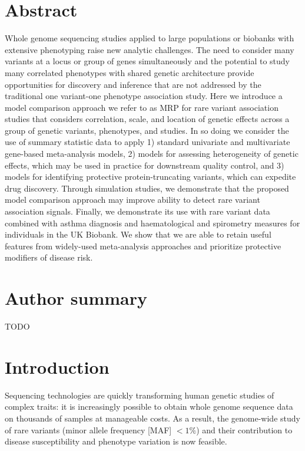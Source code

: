 \section*{Abstract}
Whole genome sequencing studies applied to large populations or biobanks with extensive phenotyping raise new analytic challenges. The need to consider many variants at a locus or group of genes simultaneously and the potential to study many correlated phenotypes with shared genetic architecture provide opportunities for discovery and inference that are not addressed by the traditional one variant-one phenotype association study. Here we introduce a model comparison approach we refer to as MRP for rare variant association studies that considers correlation, scale, and location of genetic effects across a group of genetic variants, phenotypes, and studies. In so doing we consider the use of summary statistic data to apply 1) standard univariate and multivariate gene-based meta-analysis models, 2) models for assessing heterogeneity of genetic effects, which may be used in practice for downstream quality control, and 3) models for identifying protective protein-truncating variants, which can expedite drug discovery.  Through simulation studies, we demonstrate that the proposed model comparison approach may improve ability to detect rare variant association signals. Finally, we demonstrate its use with rare variant data combined with asthma diagnosis and haematological and spirometry measures for individuals in the UK Biobank. We show that we are able to retain useful features from widely-used meta-analysis approaches and prioritize protective modifiers of disease risk.

\section*{Author summary}
TODO

\linenumbers

\section*{Introduction}
Sequencing technologies are quickly transforming human genetic studies of complex traits: it is increasingly possible to obtain whole genome sequence data on thousands of samples at manageable costs. As a result, the genome-wide study of rare variants (minor allele frequency [MAF] $< 1\%$) and their contribution to disease susceptibility and phenotype variation is now feasible\cite{ifih1,altshuler2010map,rivas2011deep,10002012integrated}. 

